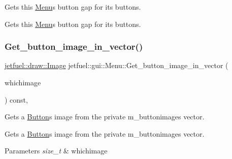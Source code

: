 Gets this \hyperlink{classjetfuel_1_1gui_1_1Menu}{Menu}\textquotesingle{}s button gap for it\textquotesingle{}s buttons. 

Gets this \hyperlink{classjetfuel_1_1gui_1_1Menu}{Menu}\textquotesingle{}s button gap for it\textquotesingle{}s buttons. \mbox{\label{classjetfuel_1_1gui_1_1Menu_a0e59c1130398764ba7880ae38ba755e3}} 
\subsubsection{\texorpdfstring{Get\+\_\+button\+\_\+image\+\_\+in\+\_\+vector()}{Get\_button\_image\_in\_vector()}}
{\footnotesize\ttfamily \hyperlink{classjetfuel_1_1draw_1_1Image}{jetfuel\+::draw\+::\+Image} jetfuel\+::gui\+::\+Menu\+::\+Get\+\_\+button\+\_\+image\+\_\+in\+\_\+vector (\begin{DoxyParamCaption}\item[{const size\+\_\+t}]{whichimage }\end{DoxyParamCaption}) const\hspace{0.3cm}{\ttfamily [inline]}, {\ttfamily [protected]}}



Gets a \hyperlink{classjetfuel_1_1gui_1_1Button}{Button}\textquotesingle{}s image from the private m\+\_\+buttonimages vector. 

Gets a \hyperlink{classjetfuel_1_1gui_1_1Button}{Button}\textquotesingle{}s image from the private m\+\_\+buttonimages vector.


\begin{DoxyParams}{Parameters}
{\em size\+\_\+t} & whichimage \\
\hline
\end{DoxyParams}
\mbox{\label{classjetfuel_1_1gui_1_1Menu_a82ebabbd98cac6a1adf4ade59af57536}} 

